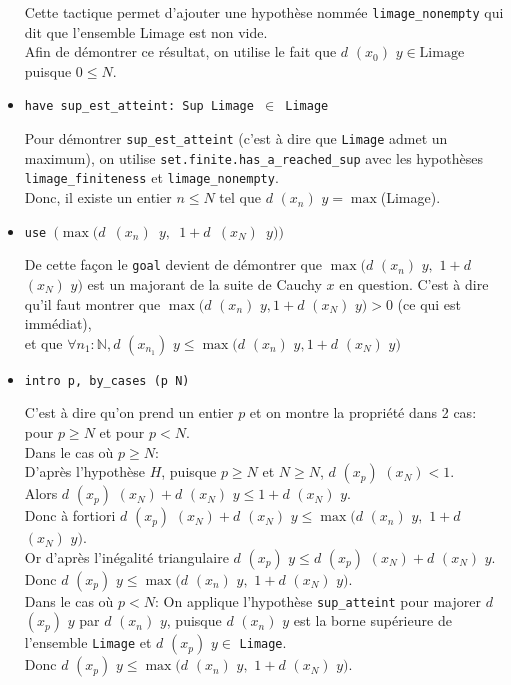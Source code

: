 \begin{itemize}
    
    Cette tactique permet d'ajouter une hypothèse nommée \texttt{limage\_nonempty} qui dit que l'ensemble Limage est non vide.\\ Afin de démontrer ce résultat, on utilise le fait que $d$ $(x_0)$ $y  \in \textrm{Limage}$ puisque $0 \leq N$.
    \item \texttt{have sup\_est\_atteint: Sup Limage $\in$ Limage}
    
    
    Pour démontrer \texttt{sup\_est\_atteint} (c'est à dire que \texttt{Limage} admet un maximum), on utilise \texttt{set.finite.has\_a\_reached\_sup} avec les hypothèses \texttt{limage\_finiteness} et \texttt{limage\_nonempty}.\\ Donc, il existe un entier $n\leq N$ tel que $d$ $(x_n)$ $y= \max$(\textrm{Limage}).
    \item \texttt{use $(\max (d$ $(x_n)$ $y,$ $1+d$ $(x_N)$ $y))$}
    
    
    De cette façon le \texttt{goal} devient de démontrer que $\max(d$ $(x_n)$ $y ,$ $1+d$ $(x_N)$ $y)$ est un majorant de la suite de Cauchy $x$ en question. \newline C'est à dire qu'il faut montrer que $\max(d$ $(x_n)$ $y , 1+d$ $(x_N)$ $y) > 0$ (ce qui est immédiat), \\ et que $\forall n_1 : \mathbb{N}, d$ $(x_{n_1})$ $y \leq \max (d$ $(x_n)$ $y , 1+ d$ $(x_N)$ $y)$
    \item \texttt{intro p, by\_cases (p \geq N)}
    
    
    C'est à dire qu'on prend un entier $p$ et on montre la propriété dans 2 cas: pour $p \geq N$ et pour $p < N$. \\
    Dans le cas où $p \geq N$: \\ D'après l'hypothèse $H$, puisque $p \geq N$ et $N \geq N$, $d$ $(x_p)$ $(x_N) < 1$. \\ Alors $d$ $(x_p)$ $(x_N) + d$ $(x_N)$ $y \leq 1 + d$ $(x_N)$ $y$. \\ Donc à fortiori $d$ $(x_p)$ $(x_N) + d$ $(x_N)$ $y \leq \max (d$ $(x_n)$ $y ,$ $1 + d$ $(x_N)$ $y)$. 
    \\ Or d'après l'inégalité triangulaire $d$ $(x_p)$ $y \leq d$ $(x_p)$ $(x_N) + d$ $(x_N)$ $y$. \\ Donc $d$ $(x_p)$ $y \leq \max (d$ $(x_n)$ $y ,$ $1 + d$ $(x_N)$ $y)$.\\
    Dans le cas où $p < N$: \newline On applique l'hypothèse \texttt{sup\_atteint} pour majorer $d$ $(x_p)$ $y$ par $d$ $(x_n)$ $y$, puisque $d$ $(x_n)$ $y$ est la borne supérieure de l'ensemble \texttt{Limage} et $d$ $(x_p)$ $y \in$ \texttt{Limage}.\\
    Donc $d$ $(x_p)$ $y \leq \max (d$ $(x_n)$ $y ,$ $1 + d$ $(x_N)$ $y)$.
\end{itemize}
